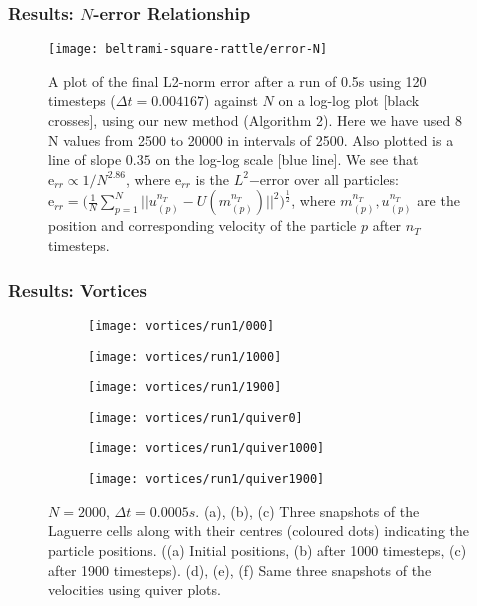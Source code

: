 \documentclass[10pt]{beamer}
\newcommand{\dt}{\Delta t}
\begin{document}
\frame
{
  \frametitle{Results: \(N\)-error Relationship}

\begin{figure}[H]
\texttt{[image: beltrami-square-rattle/error-N]}
\centering
\caption{A plot of the final L2-norm error after a run of 0.5s using 120 timesteps (\(\dt = 0.004167\)) against \(N\) on a log-log plot [black crosses], using our new method (Algorithm 2). Here we have used 8 N values from 2500 to 20000 in intervals of 2500. Also plotted is a line of slope \(0.35\) on the log-log scale [blue line]. 
We see that \(\text{e}_{rr} \propto 1/N^{2.86}\), where \(\text{e}_{rr}\) is the \(L^2\mathrm{-error}\) over all particles: \(\text{e}_{rr} = \Big( \frac{1}{N} \sum_{p = 1}^{N} || u^{n_T}_{(p)} - U(m^{n_T}_{(p)}) ||^2 \Big) ^\frac{1}{2}\), where \(m^{n_T}_{(p)}, u^{n_T}_{(p)}\) are the position and corresponding velocity of the particle \(p\) after \(n_T\) timesteps.}
\centering
\label{fig:error-N}
\end{figure}

}

\frame
{
  \frametitle{Results: Vortices}

\begin{figure}[H]
   \begin{subfigure}[t]{0.25\textwidth}
        \centering
        \texttt{[image: vortices/run1/000]}
        \caption{} \label{fig:vortices-000}
    \end{subfigure}
   \begin{subfigure}[t]{0.25\textwidth}
        \centering
	\texttt{[image: vortices/run1/1000]}
        \caption{} \label{fig:vortices-1000}
    \end{subfigure}
   \begin{subfigure}[t]{0.25\textwidth}
        \centering
	\texttt{[image: vortices/run1/1900]}
        \caption{} \label{fig:vortices-1900}
    \end{subfigure}
   \begin{subfigure}[t]{0.25\textwidth}
        \centering
        \texttt{[image: vortices/run1/quiver0]}
        \caption{} \label{fig:vortices-quiver0}
    \end{subfigure}
   \begin{subfigure}[t]{0.25\textwidth}
        \centering
        \texttt{[image: vortices/run1/quiver1000]}
        \caption{} \label{fig:vortices-quiver1000}
    \end{subfigure}
   \begin{subfigure}[t]{0.25\textwidth}
        \centering
        \texttt{[image: vortices/run1/quiver1900]}
        \caption{} \label{fig:vortices-quiver1900}
    \end{subfigure}
\centering
\caption{\(N = 2000\), \(\dt = 0.0005s\). (a), (b), (c) Three snapshots of the Laguerre cells along with their centres (coloured dots) indicating the particle positions. ((a) Initial positions, (b) after 1000 timesteps, (c) after 1900 timesteps). (d), (e), (f) Same three snapshots of the velocities using quiver plots.}
\centering
\label{fig:vortices}
\end{figure}

}
\end{document}
